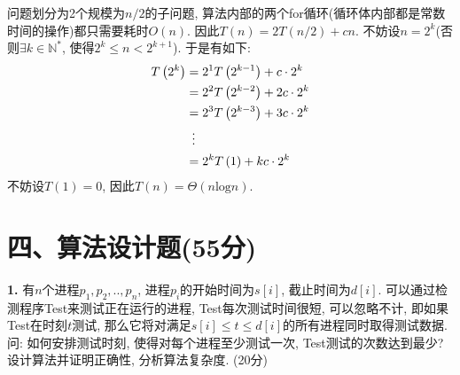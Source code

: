 \documentclass{article}
\begin{document}
\solution 问题划分为2个规模为$n/2$的子问题, 算法内部的两个for循环(循环体内部都是常数时间的操作)都只需要耗时$O(n)$. 因此$T\left( n \right) =2T\left( n/2 \right) +cn$. 不妨设$n=2^k$(否则$\exists k\in \mathbb{N}^{\ast}$, 使得$2^k\leq n <2^{k+1}$). 于是有如下:
\begin{align}
    T\left( 2^k \right) &=2^1T\left( 2^{k-1} \right) +c\cdot 2^k \notag
    \\
    &=2^2T\left( 2^{k-2} \right) +2c\cdot 2^k \notag
    \\
    &=2^3T\left( 2^{k-3} \right) +3c\cdot 2^k \notag
    \\
    &\,\,\,\vdots \notag
    \\
    &=2^kT\left( 1 \right) +kc\cdot 2^k \notag
\end{align}
不妨设$T(1)=0$, 因此$T(n)=\Theta(n\text{log}n)$.

\newpage

\section{四、算法设计题(55分)}

\textbf{1.} 有$n$个进程$p_1,p_2,..,p_n$, 进程$p_i$的开始时间为$s[i]$, 截止时间为$d[i]$. 可以通过检测程序Test来测试正在运行的进程, Test每次测试时间很短, 可以忽略不计, 即如果Test在时刻$t$测试, 那么它将对满足$s[i]\leq t \leq d[i]$的所有进程同时取得测试数据. 问: 如何安排测试时刻, 使得对每个进程至少测试一次, Test测试的次数达到最少? 设计算法并证明正确性, 分析算法复杂度. (20分)
\end{document}
